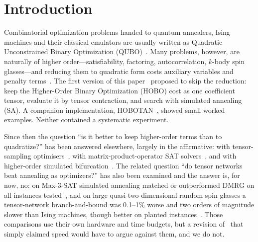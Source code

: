 \documentclass{article}
\begin{document}

\section{Introduction}
\label{sec:intro}

Combinatorial optimization problems handed to quantum annealers, Ising machines and their classical emulators are usually written as Quadratic Unconstrained Binary Optimization (QUBO)~\cite{Perdomo-Ortiz2012,Glos2022,Andrew2014,Suksmono2019,Suksmono2022}. Many problems, however, are naturally of higher order---satisfiability, factoring, autocorrelation, $k$-body spin glasses---and reducing them to quadratic form costs auxiliary variables and penalty terms~\cite{boros2002pseudoboolean,rosenberg1975reduction,mandal2020compressed}. The first version of this paper~\cite{minato2024hobo} proposed to skip the reduction: keep the Higher-Order Binary Optimization (HOBO) cost as one coefficient tensor, evaluate it by tensor contraction, and search with simulated annealing (SA). A companion implementation, HOBOTAN~\cite{yasuda2024hobotan}, showed small worked examples. Neither contained a systematic experiment.

Since then the question ``is it better to keep higher-order terms than to quadratize?'' has been answered elsewhere, largely in the affirmative: with tensor-sampling optimisers~\cite{salloum2026hubo}, with matrix-product-operator SAT solvers~\cite{zec2026tnsat}, and with higher-order simulated bifurcation~\cite{kanao2023sbhigher}. The related question ``do tensor networks beat annealing as optimizers?'' has also been examined and the answer is, for now, no: on Max-3-SAT simulated annealing matched or outperformed DMRG on all instances tested~\cite{zec2026tnsat}, and on large quasi-two-dimensional random spin glasses a tensor-network branch-and-bound was 0.1--1\% worse and two orders of magnitude slower than Ising machines, though better on planted instances~\cite{dziubyna2025limitations}. Those comparisons use their own hardware and time budgets, but a revision of~\cite{minato2024hobo} that simply claimed speed would have to argue against them, and we do not.
\end{document}
